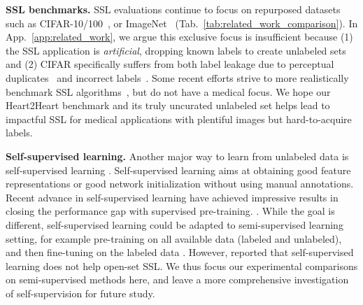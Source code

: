 

\textbf{SSL benchmarks.}
SSL evaluations continue to focus on repurposed datasets such as CIFAR-10/100~\citep{krizhevskyLearningMultipleLayers2009}, or ImageNet~\citep{deng2009imagenet} (Tab.~\ref{tab:related_work_comparison}).
In App.~\ref{app:related_work}, we argue this exclusive focus is insufficient because (1) the SSL application is \emph{artificial}, dropping known labels to create unlabeled sets and (2) CIFAR specifically suffers from both label leakage due to perceptual duplicates~\citep{barzWeTrainTest2020} and incorrect labels~\citep{northcuttPervasiveLabelErrors2021}.
Some recent efforts strive to more realistically benchmark SSL algorithms~\citep{su2021realistic, wang2022usb}, but do not have a medical focus.
We hope our Heart2Heart benchmark and its truly uncurated unlabeled set
helps lead to impactful SSL for medical applications with plentiful images but hard-to-acquire labels.



\textbf{Self-supervised learning.}
Another major way to learn from unlabeled data is self-supervised learning \citep{qi2020small}. Self-supervised learning aims at obtaining good feature representations or good network initialization without using manual annotations. Recent advance in self-supervised learning have achieved impressive results in closing the performance gap with supervised pre-training. \citep{chen2020simple, he2020momentum, chen2020improved}. While the goal is different, self-supervised learning could be adapted to semi-supervised learning setting, for example pre-training on all available data (labeled and unlabeled), and then fine-tuning on the labeled data \citep{caron2020unsupervised, chenBigSelfSupervisedModels2020}. However, \cite{saitoOpenMatchOpensetConsistency2021} reported that self-supervised learning does not help open-set SSL. We thus focus our experimental comparisons on semi-supervised methods here, and leave a more comprehensive investigation of self-supervision for future study. 
